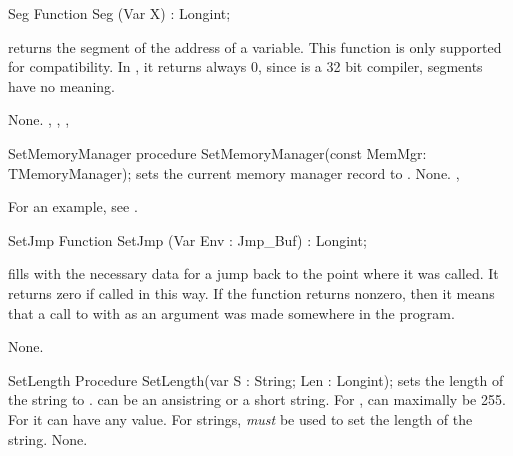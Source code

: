 
\begin{function}{Seg}
\Declaration
Function Seg (Var X) : Longint;

\Description
{} returns the segment of the address of a variable.
This function is only supported for compatibility. In \fpc, it
returns always 0, since \fpc is a 32 bit compiler, segments have no meaning.

\Errors
None.
\SeeAlso
{}, , , 
\end{function}


\begin{procedure}{SetMemoryManager}
\Declaration
procedure SetMemoryManager(const MemMgr: TMemoryManager);
\Description
{} sets the current memory manager record to
.
\Errors
None.
\SeeAlso
{}, 
\end{procedure}

For an example, see \progref.

\begin{function}{SetJmp}
\Declaration
Function SetJmp (Var Env : Jmp\_Buf) : Longint;

\Description

 fills  with the necessary data for a jump back to the
point where it was called. It returns zero if called in this way.
If the function returns nonzero, then it means that a call to 
with  as an argument was made somewhere in the program.

\Errors
None.
\SeeAlso
{}
\end{function}



\begin{procedure}{SetLength}
\Declaration
Procedure SetLength(var S : String; Len : Longint);
\Description
{} sets the length of the string  to . 
can be an ansistring or a short string.
For ,  can maximally be 255. For 
it can have any value. For  strings,  {\em
must} be used to set the length of the string.
\Errors
None.
\SeeAlso
{}
\end{procedure}





